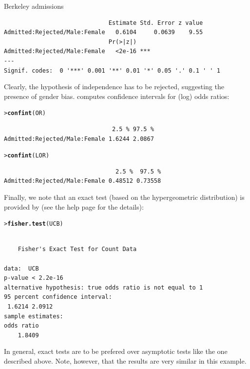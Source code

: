 \documentclass[10pt,krantz2]{krantz}\usepackage[]{graphicx}\usepackage[]{color}
\makeatletter
\newcommand{\hlstd}[1]{\textcolor[rgb]{0.345,0.345,0.345}{#1}}%
\newcommand{\hlkwd}[1]{\textcolor[rgb]{0.737,0.353,0.396}{\textbf{#1}}}%
\newenvironment{kframe}{%
 \def\at@end@of@kframe{}%
 \ifinner\ifhmode%
  \def\at@end@of@kframe{\end{minipage}}%
  \begin{minipage}{\columnwidth}%
 \fi\fi%
 \def\FrameCommand##1{\hskip\@totalleftmargin \hskip-\fboxsep
 \colorbox{shadecolor}{##1}\hskip-\fboxsep
     \hskip-\linewidth \hskip-\@totalleftmargin \hskip\columnwidth}%
 \MakeFramed {\advance\hsize-\width
   \@totalleftmargin\z@ \linewidth\hsize
   \@setminipage}}%
 {\par\unskip\endMakeFramed%
 \at@end@of@kframe}
\newenvironment{knitrout}{}{} %
\renewenvironment{knitrout}{\small\renewcommand{\baselinestretch}{.85}}{} %
\makeatother
\begin{document}
\begin{Example}[ucbadmissions]{Berkeley admissions}
\begin{knitrout}
\begin{kframe}
\begin{verbatim}
                              Estimate Std. Error z value
Admitted:Rejected/Male:Female   0.6104     0.0639    9.55
                              Pr(>|z|)    
Admitted:Rejected/Male:Female   <2e-16 ***
---
Signif. codes:  0 '***' 0.001 '**' 0.01 '*' 0.05 '.' 0.1 ' ' 1
\end{verbatim}
\end{kframe}
\end{knitrout}
\noindent Clearly, the hypothesis of independence has to be rejected,
suggesting the presence of gender bias.
 computes confidence intervals for (log) odds ratios:
\begin{knitrout}
\color{fgcolor}\begin{kframe}
\begin{alltt}
\hlstd{> }\hlkwd{confint}\hlstd{(OR)}
\end{alltt}
\begin{verbatim}
                               2.5 % 97.5 %
Admitted:Rejected/Male:Female 1.6244 2.0867
\end{verbatim}
\begin{alltt}
\hlstd{> }\hlkwd{confint}\hlstd{(LOR)}
\end{alltt}
\begin{verbatim}
                                2.5 %  97.5 %
Admitted:Rejected/Male:Female 0.48512 0.73558
\end{verbatim}
\end{kframe}
\end{knitrout}
\noindent Finally, we note that an exact test (based on the
hypergeometric distribution) is provided by
 (see the help page for the details):
\begin{knitrout}
\color{fgcolor}\begin{kframe}
\begin{alltt}
\hlstd{> }\hlkwd{fisher.test}\hlstd{(UCB)}
\end{alltt}
\begin{verbatim}

	Fisher's Exact Test for Count Data

data:  UCB
p-value < 2.2e-16
alternative hypothesis: true odds ratio is not equal to 1
95 percent confidence interval:
 1.6214 2.0912
sample estimates:
odds ratio 
    1.8409 
\end{verbatim}
\end{kframe}
\end{knitrout}
\noindent In general, exact tests are to be prefered over asymptotic tests
like the one described above. Note, however, that the results are very
similar in this example.
\end{Example} 
\end{document}
